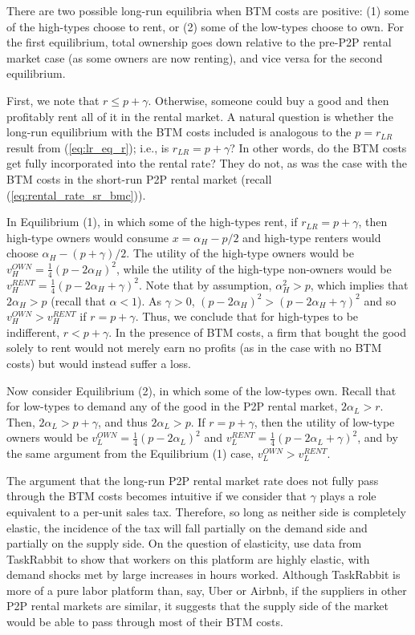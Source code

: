 \documentclass[12pt]{article}
\begin{document}
There are two possible long-run equilibria when BTM costs are positive:
(1) some of the high-types choose to rent, or
(2) some of the low-types choose to own. 
For the first equilibrium, total ownership goes down relative to the pre-P2P rental market case (as some owners are now renting), and vice versa for the second equilibrium. 

First, we note that $r \le p + \gamma$.
Otherwise, someone could buy a good and then profitably rent all of it in the rental market.
A natural question is whether the long-run equilibrium with the BTM costs included is analogous to the $p = r_{LR}$ result from (\ref{eq:lr_eq_r}); i.e., is $r_{LR} = p + \gamma$? 
In other words, do the BTM costs get fully incorporated into the rental rate?
They do not, as was the case with the BTM costs in the short-run P2P rental market (recall (\ref{eq:rental_rate_sr_bmc})). 

In Equilibrium (1), in which some of the high-types rent, if $r_{LR} = p + \gamma$,  then high-type owners would consume $x = \alpha_H - p/2$ and high-type renters would choose $\alpha_H - (p + \gamma)/2$.
The utility of the high-type owners would be $v_H^{OWN} = \frac{1}{4}(p - 2\alpha_H)^2$, while the utility of the high-type non-owners would be $v_H^{RENT} = \frac{1}{4} \left(p - 2\alpha_H + \gamma \right)^2$.
Note that by assumption, $\alpha_H^2 > p$, which implies that $2 \alpha_H > p$ (recall that $\alpha < 1$).
As $\gamma > 0$, $(p - 2\alpha_H)^2 > (p - 2\alpha_H + \gamma)^2$ and so $v_H^{OWN} > v_H^{RENT}$ if $r = p + \gamma$.
Thus, we conclude that for high-types to be indifferent, $r < p + \gamma$.
In the presence of BTM costs, a firm that bought the good solely to rent would not merely earn no profits (as in the case with no BTM costs) but would instead suffer a loss. 

Now consider Equilibrium (2), in which some of the low-types own.
Recall that for low-types to demand any of the good in the P2P rental market, $2\alpha_L > r$. 
Then, $2\alpha_L > p + \gamma$, and thus $2\alpha_L > p$.
If $r = p + \gamma$, then the utility of low-type owners would be $v_L^{OWN} = \frac{1}{4}(p - 2\alpha_L)^2$ and $v_L^{RENT} = \frac{1}{4}(p - 2\alpha_L + \gamma)^2$, and by the same argument from the Equilibrium (1) case, $v_L^{OWN} > v_L^{RENT}$. 

The argument that the long-run P2P rental market rate does not fully pass through the BTM costs becomes intuitive if we consider that $\gamma$ plays a role equivalent to a per-unit sales tax.
Therefore, so long as neither side is completely elastic, the incidence of the tax will fall partially on the demand side and partially on the supply side.
On the question of elasticity, \cite{cullen2014outsourcing} use data from TaskRabbit to show that workers on this platform are highly elastic, with demand shocks met by large increases in hours worked.
Although TaskRabbit is more of a pure labor platform than, say, Uber or Airbnb, if the suppliers in other P2P rental markets are similar, it suggests that the supply side of the market would be able to pass through most of their BTM costs. 
\end{document}
